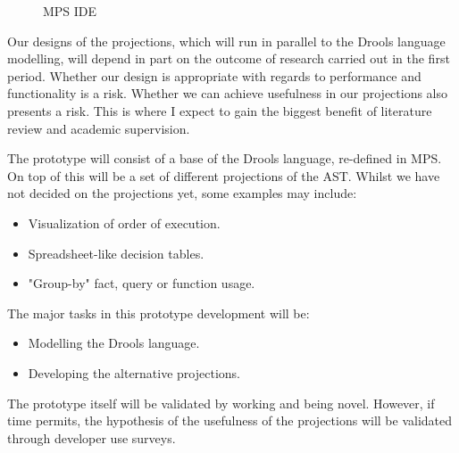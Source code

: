 \begin{figure}[!h]
    \centering
    \caption{MPS IDE}
    \label{fig:MPS_IDE}
\end{figure}

Our designs of the projections, which will run in parallel to the Drools language modelling, will depend in part on the outcome of research carried out in the first period.
Whether our design is appropriate with regards to performance and functionality is a risk. 
Whether we can achieve usefulness in our projections also presents a risk.
This is where I expect to gain the biggest benefit of literature review and academic supervision. 

The prototype will consist of a base of the Drools language, re-defined in MPS.  
On top of this will be a set of different projections of the AST.
Whilst we have not decided on the projections yet, some examples may include:
\begin{itemize}
    \item Visualization of order of execution.
    \item Spreadsheet-like decision tables.
    \item "Group-by" fact, query or function usage.
\end{itemize}


The major tasks in this prototype development will be: 
\begin{itemize}
    \item Modelling the Drools language.
    \item Developing the alternative projections.
\end{itemize}

The prototype itself will be validated by working and being novel.
However, if time permits, the hypothesis of the usefulness of the projections will be validated through developer use surveys.

